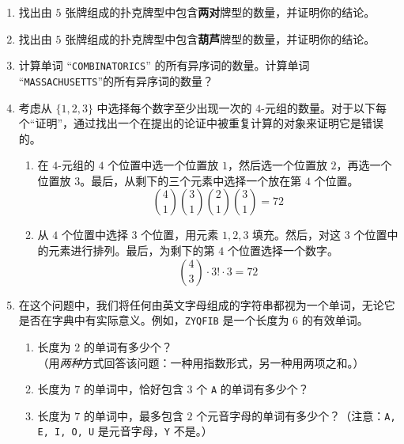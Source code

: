 \begin{enumerate}[label=(\arabic*)]
    \item 找出由 $5$ 张牌组成的扑克牌型中包含\textbf{两对}牌型的数量，并证明你的结论。
    \item 找出由 $5$ 张牌组成的扑克牌型中包含\textbf{葫芦}牌型的数量，并证明你的结论。
    \item 计算单词 ``\verb|COMBINATORICS|'' 的所有异序词的数量。计算单词 ``\verb|MASSACHUSETTS|''的所有异序词的数量？
    \item 考虑从 $\{1, 2, 3\}$ 中选择每个数字至少出现一次的 $4$-元组的数量。对于以下每个``证明''，通过找出一个在提出的论证中被重复计算的对象来证明它是错误的。
          \begin{enumerate}[label=(\alph*)]
              \item 在 $4$-元组的 $4$ 个位置中选一个位置放 $1$，然后选一个位置放 $2$，再选一个位置放 $3$。最后，从剩下的三个元素中选择一个放在第 $4$ 个位置。
                    \[{4 \choose 1}{3 \choose 1}{2 \choose 1}{3 \choose 1} = 72\]
              \item 从 $4$ 个位置中选择 $3$ 个位置，用元素 $1,2,3$ 填充。然后，对这 $3$ 个位置中的元素进行排列。最后，为剩下的第 $4$ 个位置选择一个数字。
                    \[{4 \choose 3} \cdot 3! \cdot 3 = 72\]
          \end{enumerate}
    \item 在这个问题中，我们将任何由英文字母组成的字符串都视为一个单词，无论它是否在字典中有实际意义。例如，\verb|ZYQFIB| 是一个长度为 $6$ 的有效单词。
          \begin{enumerate}[label=(\alph*)]
              \item 长度为 $2$ 的单词有多少个？\\
                    （用\emph{两种}方式回答该问题：一种用指数形式，另一种用两项之和。）
              \item 长度为 $7$ 的单词中，恰好包含 $3$ 个 \verb|A| 的单词有多少个？
              \item 长度为 $7$ 的单词中，最多包含 $2$ 个元音字母的单词有多少个？（注意：\verb|A, E, I, O, U| 是元音字母，\verb|Y| 不是。）
          \end{enumerate}


\end{enumerate}

